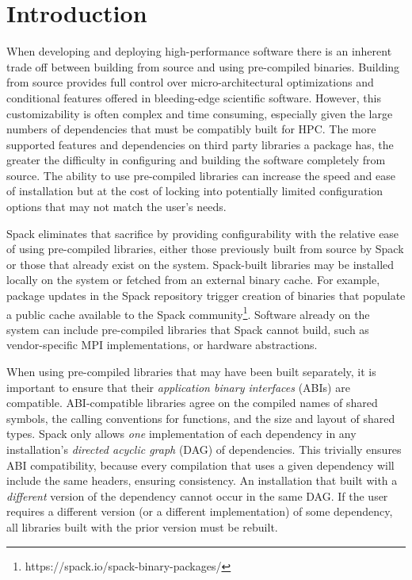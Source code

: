 \section{Introduction}
\label{sec:introduction}

When developing and deploying high-performance software there is an inherent
trade off between building from source and using pre-compiled binaries. Building
from source provides full control over micro-architectural optimizations and
conditional features offered in bleeding-edge scientific software. However,
this customizability is often complex and time consuming, especially given the
large numbers of dependencies that must be compatibly built for HPC.
The more supported features and dependencies on third party libraries a package
has, the greater the difficulty in configuring and building the software
completely from source. The ability to use pre-compiled libraries can increase
the speed and ease of installation but at the cost of locking into potentially
limited configuration options that may not match the user's needs.

Spack \cite{gamblin2015spack} eliminates that sacrifice by providing
configurability with the relative ease of using pre-compiled libraries, either
those previously built from source by Spack or those that already exist on the
system. Spack-built libraries may be installed locally on the system or fetched
from an external binary cache. For example, package updates in the Spack repository
trigger creation of binaries that populate a public cache available to the Spack
community\footnote{https://spack.io/spack-binary-packages/}. Software already on
the system can include pre-compiled libraries that Spack cannot build, such as
vendor-specific MPI implementations, or hardware abstractions.

When using pre-compiled libraries that may have been built separately, it is
important to ensure that their \emph{application binary interfaces} (ABIs)
are compatible. ABI-compatible libraries agree on the compiled names of shared
symbols, the calling conventions for functions, and the size and layout of
shared types. Spack only allows {\it one} implementation of each dependency
in any installation's {\it directed acyclic graph} (DAG) of dependencies.
This trivially ensures ABI compatibility, because every compilation that
uses a given dependency will include the same headers, ensuring consistency.
An installation that built with a {\it different} version of the dependency
cannot occur in the same DAG. If the user requires a different version (or a
different implementation) of some dependency, all libraries built with the
prior version must be rebuilt.

